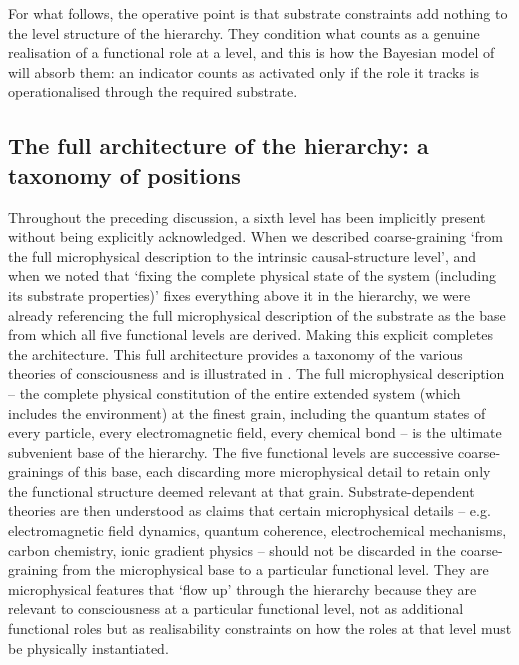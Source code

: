 \documentclass[11pt, a4paper, onecolumn, gdm]{google}
\begin{document}
For what follows, the operative point is that substrate constraints add nothing to the level structure of the hierarchy.
They condition what counts as a genuine realisation of a functional role at a level, and this is how the Bayesian model of  will absorb them: an indicator counts as activated only if the role it tracks is operationalised through the required substrate.

\subsection{The full architecture of the hierarchy: a taxonomy of positions}\label{the-full-architecture-of-the-hierarchy-a-taxonomy-of-positions}

Throughout the preceding discussion, a sixth level has been implicitly present without being explicitly acknowledged.
When we described coarse-graining `from the full microphysical description to the intrinsic causal-structure level', and when we noted that `fixing the complete physical state of the system (including its substrate properties)' fixes everything above it in the hierarchy, we were already referencing the full microphysical description of the substrate as the base from which all five functional levels are derived.
Making this explicit completes the architecture.
This full architecture provides a taxonomy of the various theories of consciousness and is illustrated in .
The full microphysical description -- the complete physical constitution of the entire extended system (which includes the environment) at the finest grain, including the quantum states of every particle, every electromagnetic field, every chemical bond -- is the ultimate subvenient base of the hierarchy.
The five functional levels are successive coarse-grainings of this base, each discarding more microphysical detail to retain only the functional structure deemed relevant at that grain.
Substrate-dependent theories are then understood as claims that certain microphysical details -- e.g. electromagnetic field dynamics, quantum coherence, electrochemical mechanisms, carbon chemistry, ionic gradient physics -- should not be discarded in the coarse-graining from the microphysical base to a particular functional level.
They are microphysical features that `flow up' through the hierarchy because they are relevant to consciousness at a particular functional level, not as additional functional roles but as realisability constraints on how the roles at that level must be physically instantiated.
\end{document}
